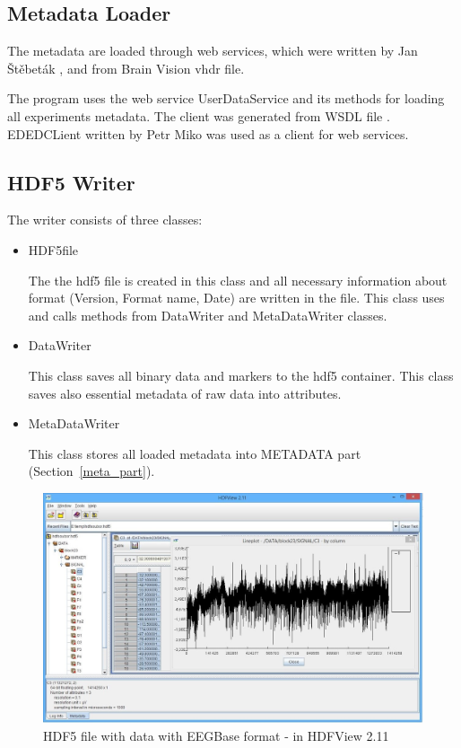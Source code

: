 \subsection{Metadata Loader}
The metadata are loaded through web services, which were written by Jan Štěbeták \cite{webservice}, and from Brain Vision vhdr file.

The program uses the web service UserDataService and its methods for loading all experiments metadata.
The client was generated from \gls{WSDL} file \cite{wsdl}. EDEDCLient \cite{jerpa} written by Petr Miko was used as a client for web services.

\subsection{HDF5 Writer}
The writer consists of three classes:
\begin{itemize}
	\item HDF5file
	
	The the \gls{hdf5} file is created in this class and all necessary information about format (Version, Format name, Date) are written in the file. This class uses and calls methods from DataWriter and MetaDataWriter classes.
	
	\item DataWriter
	
	This class saves all binary data and markers to the \gls{hdf5} container. This class saves also essential metadata of raw data into attributes.
	
	\item MetaDataWriter
	
	This class stores all loaded metadata into METADATA part (Section~\ref{meta_part}).
	
\end{itemize}

\begin{figure}
	\begin{center}
		\includegraphics[scale=0.4]{obrazky/HDF5_file.jpg}
		\caption{HDF5 file with data with EEGBase format - in HDFView 2.11}
		\label{hdf5_file}
	\end{center}
\end{figure}

